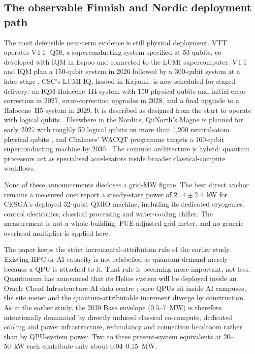 \documentclass[11pt,a4paper]{article}
\begin{document}
\subsection{The observable Finnish and Nordic deployment path}
The most defensible near-term evidence is still physical deployment. VTT operates VTT~Q50, a superconducting system specified at 53 qubits, co-developed with IQM in Espoo and connected to the LUMI supercomputer. VTT and IQM plan a 150-qubit system in 2026 followed by a 300-qubit system at a later stage \citep{vtt2026infra,vtt2025iqm300}. CSC's LUMI-IQ, hosted in Kajaani, is now scheduled for staged delivery: an IQM Halocene~H4 system with 150 physical qubits and initial error correction in 2027, error-correction upgrades in 2028, and a final upgrade to a Halocene~H5 system in 2029. It is described as designed from the start to operate with logical qubits \citep{csc2026lumiiq}. Elsewhere in the Nordics, QuNorth's Magne is planned for early 2027 with roughly 50 logical qubits on more than 1,200 neutral-atom physical qubits \citep{qunorth2026magne}, and Chalmers' WACQT programme targets a 100-qubit superconducting machine by 2030 \citep{chalmers2026}. The common architecture is hybrid: quantum processors act as specialised accelerators inside broader classical-compute workflows.

None of these announcements discloses a grid-MW figure. The best direct anchor remains a measured one: \citet{carrasco2026energy} report a steady-state power of $21.4\pm2.4$~kW for CESGA's deployed 32-qubit QMIO machine, including its dedicated cryogenics, control electronics, classical processing and water-cooling chiller. The measurement is not a whole-building, PUE-adjusted grid meter, and no generic overhead multiplier is applied here.

The paper keeps the strict incremental-attribution rule of the earlier study. Existing HPC or AI capacity is not relabelled as quantum demand merely because a QPU is attached to it. That rule is becoming more important, not less. Quantinuum has announced that its Helios system will be deployed inside an Oracle Cloud Infrastructure AI data centre \citep{quantinuum2026q2}; once QPUs sit inside AI campuses, the site meter and the quantum-attributable increment diverge by construction. As in the earlier study, the 2030 Base envelope (0.5--7~MW) is therefore intentionally dominated by directly induced classical co-compute, dedicated cooling and power infrastructure, redundancy and connection headroom rather than by QPU-system power. Two to three present-system equivalents at 20--50~kW each contribute only about 0.04--0.15~MW.
\end{document}
